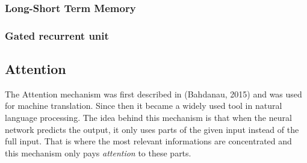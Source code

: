 \subsubsection{Long-Short Term Memory}
\subsubsection{Gated recurrent unit}
\subsection{Attention}
The Attention mechanism was first described in (Bahdanau, 2015) and was used for machine translation. Since then it became a widely used tool in natural language processing. The idea behind this mechanism is that when the neural network predicts the output, it only uses parts of the given input instead of the full input. That is where the most relevant informations are concentrated and this mechanism only pays \textit{attention} to these parts.